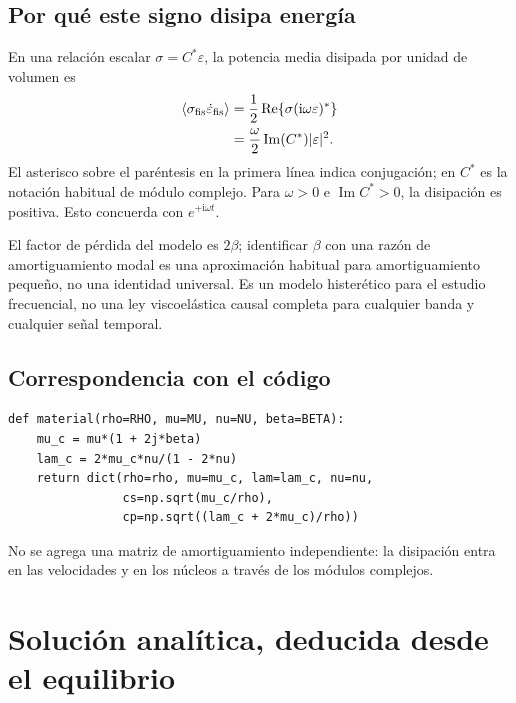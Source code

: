 \documentclass[11pt,a4paper]{report}
\numberwithin{equation}{chapter}
\newcommand{\ii}{\mathrm{i}}
\begin{document}
\section{Por qu\'e este signo disipa energ\'ia}
En una relaci\'on escalar $\sigma=C^*\varepsilon$, la potencia media
disipada por unidad de volumen es
\begin{align}
 \left\langle \sigma_{\rm fis}\dot\varepsilon_{\rm fis}\right\rangle
 &=\frac12\operatorname{Re}
       \{\sigma(\ii\omega\varepsilon)^*\}\\
 &=\frac{\omega}{2}\operatorname{Im}(C^*)|\varepsilon|^2.
\end{align}
El asterisco sobre el par\'entesis en la primera l\'inea indica conjugaci\'on;
en $C^*$ es la notaci\'on habitual de m\'odulo complejo.
Para $\omega>0$ e $\operatorname{Im}C^*>0$, la disipaci\'on es positiva.
Esto concuerda con $e^{+\ii\omega t}$.

\begin{cuidado}
El factor de p\'erdida del modelo es $2\beta$; identificar $\beta$ con
una raz\'on de amortiguamiento modal es una aproximaci\'on habitual para
amortiguamiento peque\~no, no una identidad universal. Es un modelo
hister\'etico para el estudio frecuencial, no una ley viscoel\'astica
causal completa para cualquier banda y cualquier se\~nal temporal.
\end{cuidado}

\section{Correspondencia con el c\'odigo}
\begin{lstlisting}
def material(rho=RHO, mu=MU, nu=NU, beta=BETA):
    mu_c = mu*(1 + 2j*beta)
    lam_c = 2*mu_c*nu/(1 - 2*nu)
    return dict(rho=rho, mu=mu_c, lam=lam_c, nu=nu,
                cs=np.sqrt(mu_c/rho),
                cp=np.sqrt((lam_c + 2*mu_c)/rho))
\end{lstlisting}
No se agrega una matriz de amortiguamiento independiente:
la disipaci\'on entra en las velocidades y en los n\'ucleos a trav\'es
de los m\'odulos complejos.

\chapter{Soluci\'on anal\'itica, deducida desde el equilibrio}
\label{ch:analitica}
\end{document}

